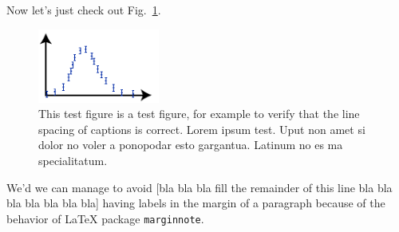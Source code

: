 \documentclass[10pt,a4paper,aps,reprint,notitlepage,nofootinbib]{revtex4-1}
\begin{document}
Now let's just check out Fig.~\ref{fig:test}.
\begin{figure}
  \centering
  \includegraphics[width=4cm]{testfigure}
  \caption{This test figure is a test figure, for example to verify that the line spacing
    of captions is correct. Lorem ipsum test.  Uput non amet si dolor no voler a ponopodar
    esto gargantua.  Latinum no es ma specialitatum. }
  \label{fig:test}
\end{figure}

We'd   we can manage to avoid [bla bla bla fill the remainder of this line bla bla bla bla bla bla bla] having labels
 in the margin of a paragraph because of the behavior of LaTeX
package \texttt{marginnote}.





\end{document}
